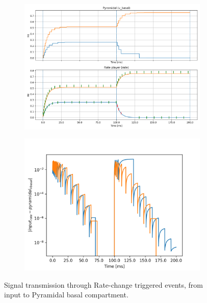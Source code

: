 \documentclass{article}
\begin{document}
\begin{figure}[h!bt]
    \centering
    \begin{subfigure}[b]{0.6\textwidth}
        \centering
        \includegraphics[width=\textwidth]{drate_0p05_rate_player_plus_pyramid_behaviour.png}
        \caption{}
        \label{fig:drate-transmission}
    \end{subfigure}
    \hfill
    \begin{subfigure}[b]{0.35\textwidth}
        \centering
        \includegraphics[width=\textwidth]{drate_0p05_rate_differences.png}
        \vspace*{0.75cm}
        \caption{}
        \label{fig:drate-signal-difference}
    \end{subfigure}

    \caption{Signal transmission through Rate-change triggered events, from input to Pyramidal basal compartment.}
    \label{fig:drate-example}
\end{figure}
\end{document}
